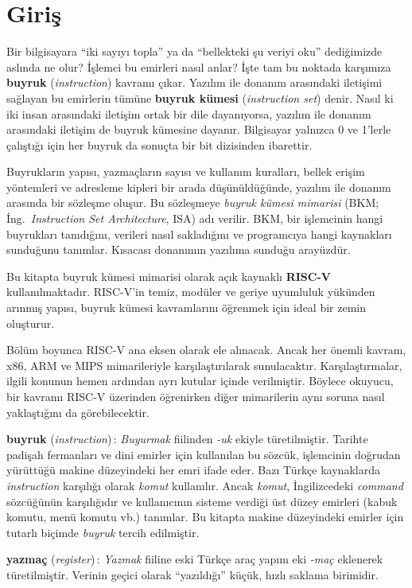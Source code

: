 \section{Giriş}

Bir bilgisayara ``iki sayıyı topla'' ya da ``bellekteki şu veriyi oku'' dediğimizde aslında ne olur? İşlemci bu emirleri nasıl anlar? İşte tam bu noktada karşımıza \textbf{buyruk} (\emph{instruction}) kavramı çıkar. Yazılım ile donanım arasındaki iletişimi sağlayan bu emirlerin tümüne \textbf{buyruk kümesi} (\emph{instruction set}) denir. Nasıl ki iki insan arasındaki iletişim ortak bir dile dayanıyorsa, yazılım ile donanım arasındaki iletişim de buyruk kümesine dayanır. Bilgisayar yalnızca 0 ve 1'lerle çalıştığı için her buyruk da sonuçta bir bit dizisinden ibarettir.

Buyrukların yapısı, yazmaçların sayısı ve kullanım kuralları, bellek erişim yöntemleri ve adresleme kipleri bir arada düşünüldüğünde, yazılım ile donanım arasında bir sözleşme oluşur. Bu sözleşmeye \emph{buyruk kümesi mimarisi} (BKM; İng.\ \emph{Instruction Set Architecture}, ISA) adı verilir. BKM, bir işlemcinin hangi buyrukları tanıdığını, verileri nasıl sakladığını ve programcıya hangi kaynakları sunduğunu tanımlar. Kısacası donanımın yazılıma sunduğu arayüzdür.

Bu kitapta buyruk kümesi mimarisi olarak açık kaynaklı \textbf{RISC-V} kullanılmaktadır. RISC-V'in temiz, modüler ve geriye uyumluluk yükünden arınmış yapısı, buyruk kümesi kavramlarını öğrenmek için ideal bir zemin oluşturur.

Bölüm boyunca RISC-V ana eksen olarak ele alınacak. Ancak her önemli kavram, x86, ARM ve MIPS mimarileriyle karşılaştırılarak sunulacaktır. Karşılaştırmalar, ilgili konunun hemen ardından ayrı kutular içinde verilmiştir. Böylece okuyucu, bir kavramı RISC-V üzerinden öğrenirken diğer mimarilerin aynı soruna nasıl yaklaştığını da görebilecektir.

\begin{terimnotu}
\textbf{buyruk} (\emph{instruction})\,: \emph{Buyurmak} fiilinden \emph{-uk} ekiyle türetilmiştir. Tarihte padişah fermanları ve dini emirler için kullanılan bu sözcük, işlemcinin doğrudan yürüttüğü makine düzeyindeki her emri ifade eder. Bazı Türkçe kaynaklarda \emph{instruction} karşılığı olarak \emph{komut} kullanılır. Ancak \emph{komut}, İngilizcedeki \emph{command} sözcüğünün karşılığıdır ve kullanıcının sisteme verdiği üst düzey emirleri (kabuk komutu, menü komutu vb.) tanımlar. Bu kitapta makine düzeyindeki emirler için tutarlı biçimde \emph{buyruk} tercih edilmiştir.

\textbf{yazmaç} (\emph{register})\,: \emph{Yazmak} fiiline eski Türkçe araç yapım eki \emph{-maç} eklenerek türetilmiştir. Verinin geçici olarak ``yazıldığı'' küçük, hızlı saklama birimidir.
\end{terimnotu}

